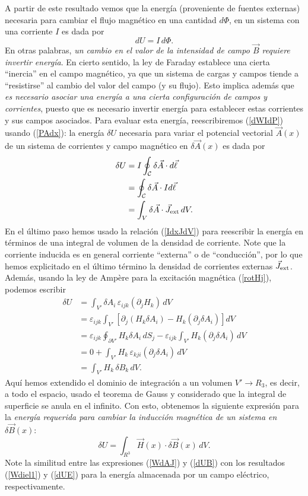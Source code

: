 A partir de este resultado vemos que la energía (proveniente de fuentes externas) necesaria para cambiar el flujo magnético en una cantidad $d\Phi$, en un sistema con una corriente $I$ es dada por
\begin{equation}\label{dWIdP}
 \boxed{dU=I\,d\Phi.}
\end{equation}
En otras palabras, \textit{un cambio en el valor de la intensidad de campo $\vec{B}$ requiere invertir energía}. En cierto sentido, la ley de Faraday establece una cierta ``inercia'' en el campo magnético, ya que un sistema de cargas y campos tiende a ``resistirse'' al cambio del valor del campo (y su flujo). 
Esto implica además que \textit{es necesario asociar una energía a una cierta configuración de campos y corrientes}, puesto que es necesario invertir energía para establecer estas corrientes y sus campos asociados. Para evaluar esta energía, reescribiremos (\ref{dWIdP}) usando (\ref{PAdx}): la energía $\delta U$ necesaria para variar el potencial vectorial $\vec{A}(x)$ de un sistema de corrientes y campo magnético en $\delta\vec{A}(x)$ es dada por
\begin{align}
 \delta U &= I\oint_{\cal C}\delta\vec{A}\cdot d\vec{\ell} \\
 &= \oint_{\cal C}\delta\vec{A}\cdot Id\vec{\ell} \\
 &= \int_V\delta\vec{A}\cdot \vec{J}_{\rm ext}\,dV. \label{WdAJ}
\end{align}
En el último paso hemos usado la relación (\ref{IdxJdV}) para reescribir la energía en términos de una integral de volumen de la densidad de corriente. Note que la corriente inducida es en general corriente ``externa'' o de ``conducción'', por lo que hemos explicitado en el último término la densidad de corrientes externas $\vec{J}_{\rm ext}$. Además, usando la ley de Amp\`ere para la excitación magnética (\ref{rotHj}), podemos escribir
\begin{align}
 \delta U 
&= \int_{V'} \delta A_i\,\varepsilon_{ijk}\left(\partial_jH_k\right)\,dV \\
&= \varepsilon_{ijk}\int_{V'} \left[\partial_j(H_k\delta A_i)-H_k(\partial_j\delta A_i)\right]dV\\
&= \varepsilon_{ijk}\oint_{\partial V'}H_k\delta
A_i\,dS_j-\varepsilon_{ijk}\int_{V'}H_k(\partial_j\delta A_i)\,dV\\
&= 0+\int_{V'} H_k\,\varepsilon_{kji}(\partial_j\delta A_i)\,dV\\
&= \int_{V'} H_k\,\delta B_k\,dV.
\end{align}
Aquí hemos extendido el dominio de integración a un volumen $V'\to R_3$, es decir, a todo el espacio, usado el teorema de Gauss y considerado que la integral de superficie se anula en el infinito. Con esto, obtenemos la siguiente expresión para la \textit{energía requerida para cambiar la inducción magnética de un sistema en $\delta{\vec B}(x)$}:
\begin{equation}
 \boxed{\delta U=\int_{R^3} \vec{H}(x)\cdot \delta\vec{B}(x)\,dV.}\label{dUB}
\end{equation}
Note la similitud entre las expresiones (\ref{WdAJ}) y (\ref{dUB}) con los resultados (\ref{Wdiel1}) y (\ref{dUE}) para la energía almacenada por un campo eléctrico, respectivamente.

